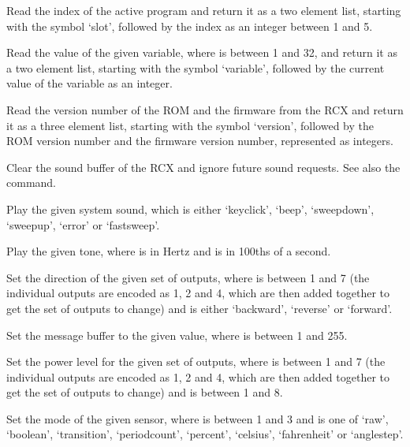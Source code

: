   Read the index of the active program and return it as a two element list, starting with the symbol `slot', followed
  by the index as an integer between 1 and 5.
  
  Read the value of the given variable, where  is between 1 and 32, and return it as a two element list,
  starting with the symbol `variable', followed by the current value of the variable as an integer.
  
  Read the version number of the ROM and the firmware from the RCX and return it as a three element list, starting
  with the symbol `version', followed by the ROM version number and the firmware version number, represented as integers.
  
  Clear the sound buffer of the RCX and ignore future sound requests.
  See also the  command.
  
  Play the given system sound, which is either `keyclick', `beep', `sweepdown', `sweepup', `error' or `fast\-sweep'.
  
  Play the given tone, where  is in Hertz and  is in 100ths of a second.
  
  Set the direction of the given set of outputs, where  is between 1 and 7
  (the individual outputs are encoded as 1, 2 and 4, which are then added together to get the set of outputs to change) and
   is either `backward', `reverse' or `forward'.
  
  Set the message buffer to the given value, where  is between 1 and 255.
  
  Set the power level for the given set of outputs, where  is between 1 and 7
  (the individual outputs are encoded as 1, 2 and 4, which are then added together to get the set of outputs to change) and
   is between 1 and 8.
  
  Set the mode of the given sensor, where  is between 1 and 3 and  is one of `raw', `boolean',
  `transition', `periodcount', `percent', `celsius', `fahrenheit' or `anglestep'.
  
